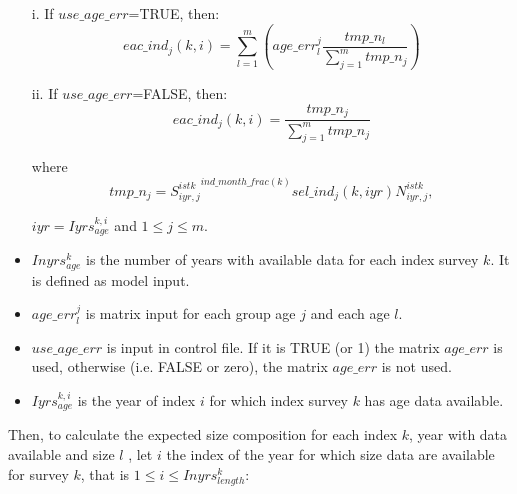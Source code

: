 \documentclass{article}
\begin{document}
\begin{itemize}
    \item [i.] If $use\_age\_err$=TRUE, then: 
    \begin{equation}
        eac\_ind_j(k,i)=\sum_{l=1}^m \left(age\_err^j_l \dfrac{tmp\_n_l}{\sum_{j=1}^mtmp\_n_j}\right)
    \end{equation}
    
    \item [ii.] If $use\_age\_err$=FALSE, then:
    \begin{equation}eac\_ind_j(k,i)=\dfrac{tmp\_n_j}{\sum_{j=1}^mtmp\_n_j}
    \end{equation}

where \begin{equation}
    tmp\_n_j= {S^{istk}_{iyr,j}}^{ind\_month\_frac(k)}sel\_ind_j(k,iyr)N^{istk}_{iyr,j},
\end{equation}

 $iyr=Iyrs^{k,i}_{age}$ and $1\leq j\leq m$.
 
\end{itemize}
    
\begin{itemize}

    \item $Inyrs^k_{age}$ is the number of years with available data for each index survey $k$. It is defined as model input. 
    \item $age\_err^j_l$ is matrix input for each group age $j$ and each age $l$.
    \item $use\_age\_err$ is input in control file. If it is TRUE (or 1) the matrix $age\_err$ is used, otherwise (i.e. FALSE or zero), the matrix $age\_err$ is not used. 
    
    
    
    \item $Iyrs^{k,i}_{age}$ is the year of index $i$ for which index survey $k$ has age data available. 

\end{itemize} 

Then, to calculate the expected size composition for each index $k$, year with data available and size $l$ %
, let $i$ the index of the year for which size data are available for survey $k$, that is $1\leq i \leq Inyrs^k_{length}$:
\end{document}
